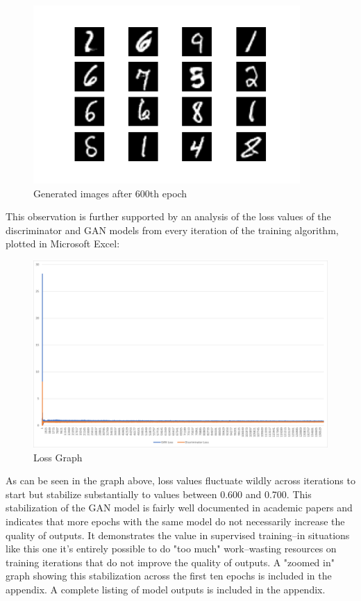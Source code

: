 \documentclass{article}
\begin{document}
\begin{figure}[H]
    \centering
    \includegraphics[width=4in]{csci-8110/hw-4/images/generated_plot_e600.png}
    \caption{Generated images after 600th epoch}
    \label{fig:ep600}
\end{figure}

\par This observation is further supported by an analysis of the loss values of the discriminator and GAN models from every iteration of the training algorithm, plotted in Microsoft Excel:

\begin{figure}[H]
    \centering
    \includegraphics[width=6in]{csci-8110/hw-4/images/8110_hw4_loss.png}
    \caption{Loss Graph}
    \label{fig:loss_graph}
\end{figure}

\par As can be seen in the graph above, loss values fluctuate wildly across iterations to start but stabilize substantially to values between 0.600 and 0.700.
This stabilization of the GAN model is fairly well documented in academic papers and indicates that more epochs with the same model do not necessarily increase the quality of outputs.
It demonstrates the value in supervised training--in situations like this one it's entirely possible to do "too much" work--wasting resources on training iterations that do not improve the quality of outputs.
A "zoomed in" graph showing this stabilization across the first ten epochs is included in the  appendix.
A complete listing of model outputs is included in the  appendix.
\end{document}
